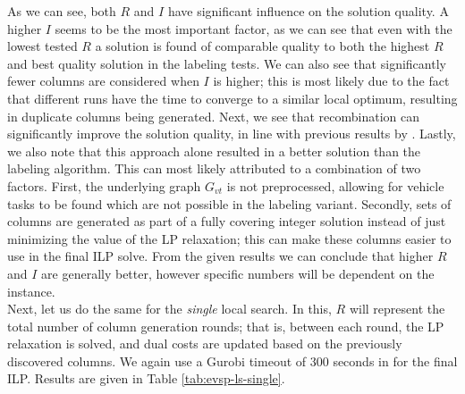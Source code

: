 \documentclass[]{article}
\begin{document}
As we can see, both $R$ and $I$ have significant influence on the solution quality. A higher $I$ seems to be the most important factor, as we can see that even with the lowest tested $R$ a solution is found of comparable quality to both the highest $R$ and best quality solution in the labeling tests. We can also see that significantly fewer columns are considered when $I$ is higher; this is most likely due to the fact that different runs have the time to converge to a similar local optimum, resulting in duplicate columns being generated. Next, we see that recombination can significantly improve the solution quality, in line with previous results by \citet{Bosch21}. Lastly, we also note that this approach alone resulted in a better solution than the labeling algorithm. This can most likely attributed to a combination of two factors. First, the underlying graph $G_{vt}$ is not preprocessed, allowing for vehicle tasks to be found which are not possible in the labeling variant. Secondly, sets of columns are generated as part of a fully covering integer solution instead of just minimizing the value of the LP relaxation; this can make these columns easier to use in the final ILP solve. From the given results we can conclude that higher $R$ and $I$ are generally better, however specific numbers will be dependent on the instance.  \\

Next, let us do the same for the \emph{single} local search. In this, $R$ will represent the total number of column generation rounds; that is, between each round, the LP relaxation is solved, and dual costs are updated based on the previously discovered columns. We again use a Gurobi timeout of 300 seconds in for the final ILP. Results are given in Table \ref{tab:evsp-ls-single}.
\end{document}
